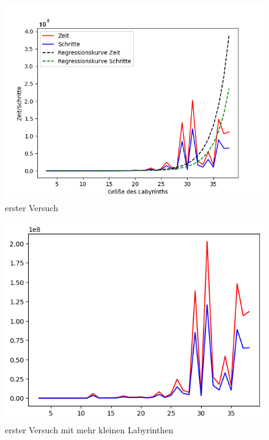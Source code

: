 \documentclass[12pt, a4paper, titlepage]{article}
\begin{document}
\begin{figure}[h]
	\centering
	\includegraphics[scale=.5]{v1Aus.png}
	\caption{erster Versuch}
	\label{fig:Plot v1}
\end{figure}


\begin{figure}[h]
	\centering
	\includegraphics[scale=.5]{v1_3.png}
	\caption{erster Versuch mit mehr kleinen Labyrinthen}
	\label{fig:Plot v1_3}
\end{figure}
 
\end{document}
